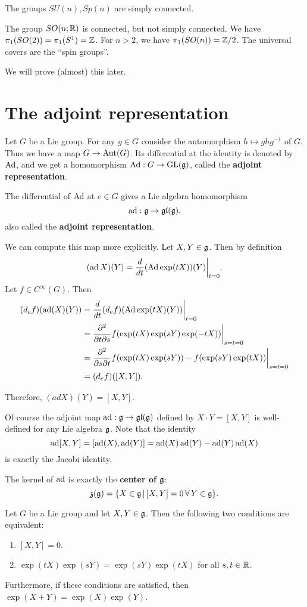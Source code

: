 \documentclass[11pt, english]{article}
\begin{document}
\begin{example}
  The groups $SU(n), Sp(n)$ are simply connected.

The group $SO(n;\mathbb{R})$ is connected, but not simply connected. We have $\pi_1(SO(2)) = \pi_1(S^1) = \mathbb{Z}$. For $n > 2$, we have $\pi_1(SO(n)) = \mathbb{Z}/2$. The universal covers are the ``spin groups''.

We will prove (almost) this later.
\end{example}

\newpage
\section{The adjoint representation}

Let $G$ be a Lie group. For any $g \in G$ consider the automorphism $h \mapsto ghg^{-1}$ of $G$. Thus we have a map $G \to \operatorname{Aut}(G)$. Its differential at the identity is denoted by $\operatorname{Ad}$, and we get a homomorphism ${\operatorname{Ad}:G \to \operatorname{GL}(\mathfrak g)}$, called the \textbf{adjoint representation}.

The differential of $\operatorname{Ad}$ at $e \in G$ gives a Lie algebra homomorphism
$$
\operatorname{ad}:\mathfrak g \to \mathfrak{gl}(\mathfrak g),
$$
also called the \textbf{adjoint representation}. 

We can compute this map more explicitly. Let $X,Y \in \mathfrak g$. Then by definition
$$
(\ad X)(Y) = \restr{\frac{d}{dt}( \Ad \exp(tX))(Y)}{t=0}.
$$
Let $f \in C^\infty(G)$. Then
\begin{align*}
  (d_ef)(\ad(X)(Y)) &= \restr{\frac{d}{dt} (d_ef)( \Ad \exp(tX)(Y))}{t=0} \\
&= \restr{\frac{\partial^2}{\partial t \partial s}f(\exp(tX)\exp(sY)\exp(-tX) )}{s=t=0} \\
&= \restr{\frac{\partial^2}{\partial s \partial t} f(\exp(tX)\exp(sY))-f(\exp (sY)\exp(tX))}{s=t=0} \\
&= (d_ef)([X,Y]).
\end{align*}

Therefore, $(ad X)(Y) = [X,Y]$.

Of course  the adjoint map $\operatorname{ad}: \mathfrak g \to \mathfrak{gl}(\mathfrak g)$ defined by $X \cdot Y = [X,Y]$ is well-defined for any Lie algebra $\mathfrak g$. Note that the identity 
$$
\operatorname{ad} [X,Y] = [\operatorname{ad} (X), \operatorname{ad}(Y)] = \operatorname{ad}(X) \operatorname{ad} (Y) - \operatorname{ad}(Y) \operatorname{ad}(X)
$$
is exactly the Jacobi identity.

The kernel of $\operatorname{ad}$ is exactly the \textbf{center of $\mathfrak g$}:
$$
\mathfrak{z}(\mathfrak g) = \{ X \in \mathfrak g \, | \, [X,Y] = 0 \, \forall \, Y \in \mathfrak g \}.
$$

\begin{prop}
\label{propcommute}
  Let $G$ be a Lie group and let $X,Y \in \mathfrak g$. Then the following two conditions are equivalent:
  \begin{enumerate}
  \item $[X,Y]=0$.
\item $\exp(tX)\exp(sY) = \exp(sY) \exp(tX)$ for all $s,t \in \mathbb{R}$.
  \end{enumerate}

Furthermore, if these conditions are satisfied, then $\exp(X+Y) = \exp(X)\exp(Y)$.
\end{prop}
\end{document}
